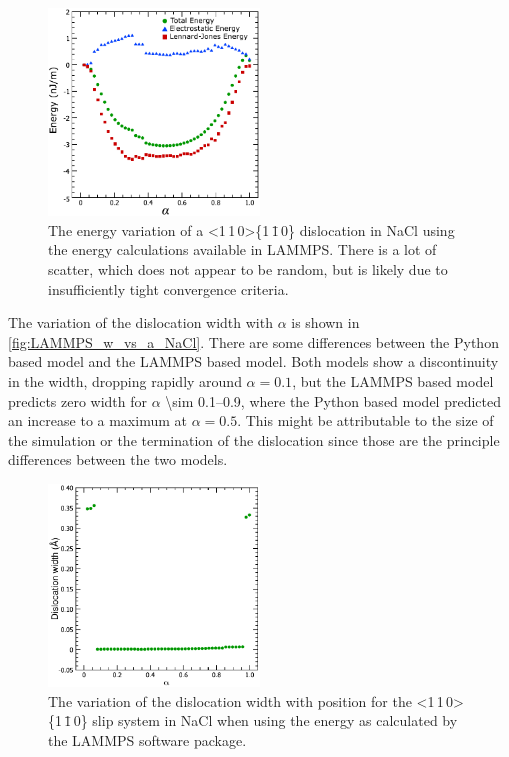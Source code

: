 \begin{figure}
\centering
\includegraphics[width=0.5\textwidth]{NaCl_110_110_U_vs_alpha_LAMMPS}
\caption[The energy changes of a dislocation in NaCl via LAMMPS.]{The energy variation of a <1\,1\,0>\{1\,\={1}\,0\} dislocation in NaCl using the energy calculations available in LAMMPS. There is a lot of scatter, which does not appear to be random, but is likely due to insufficiently tight convergence criteria.\label{fig:NaCl_110_110_U_vs_a_LAMMPS}}
\end{figure}

The variation of the dislocation width with $\alpha$ is shown in \autoref{fig:LAMMPS_w_vs_a_NaCl}. There are some differences between the Python based model and the LAMMPS based model. Both models show a discontinuity in the width, dropping rapidly around $\alpha=0.1$, but the LAMMPS based model predicts zero width for $\alpha$ \numrange{\sim 0.1}{ 0.9}, where the Python based model predicted an increase to a maximum at $\alpha=0.5$. This might be attributable to the size of the simulation or the termination of the dislocation since those are the principle differences between the two models.

\begin{figure}
\centering
\includegraphics[width=0.5\textwidth]{NaCl_110_110_w_vs_a_LAMMPS}
\captionsetup{width=0.6\textwidth}
\caption[The variation of the dislocation width for the hard slip system in NaCl.]{The variation of the dislocation width with position for the <1\,1\,0>\{1\,\={1}\,0\} slip system in NaCl when using the energy as calculated by the LAMMPS software package.\label{fig:LAMMPS_w_vs_a_NaCl}}
\end{figure}


